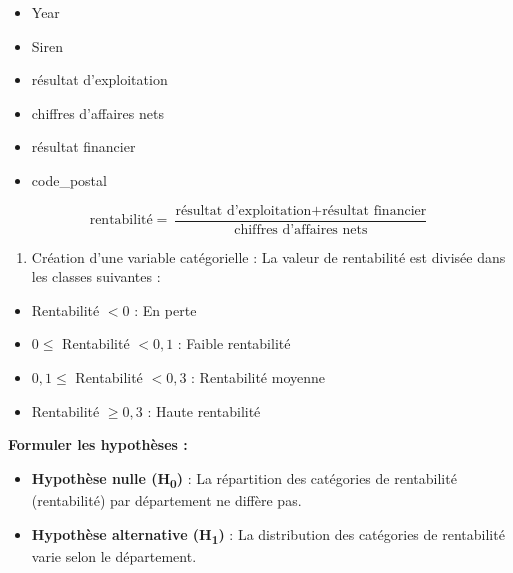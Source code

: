 \documentclass[mstat,12pt]{unswthesis}
\begin{document}
\begin{itemize}[label=$\circ$]
    \item \textnormal{Year}
    \item \textnormal{Siren}
    \item \textnormal{résultat d'exploitation}
    \item \textnormal{chiffres d’affaires nets}
    \item \textnormal{résultat financier}
    \item \textnormal{code\_postal}
\end{itemize}

\[
      \text{rentabilité} = \frac{\text{résultat d'exploitation} + \text{résultat financier}}{\text{chiffres d’affaires nets}}
\]

\begin{enumerate}
\def\labelenumi{\arabic{enumi})}
\setcounter{enumi}{2}
\tightlist
\item
  Création d'une variable catégorielle : La valeur de rentabilité est
  divisée dans les classes suivantes :
\end{enumerate}

\begin{itemize}[label=$\circ$]
    \item \textnormal{Rentabilité $< 0$ : \og En perte\fg}
    \item \textnormal{$0 \leq$ Rentabilité $< 0{,}1$ : \og Faible rentabilité\fg}
    \item \textnormal{$0{,}1 \leq$ Rentabilité $< 0{,}3$ : \og Rentabilité moyenne\fg}
    \item \textnormal{Rentabilité $\geq 0{,}3$ : \og Haute rentabilité\fg}
\end{itemize}

\newpage

\textbf{Formuler les hypothèses :}

\bigskip

\begin{itemize}
\tightlist
\item
  \textbf{Hypothèse nulle (H\textsubscript{0})} : La répartition des
  catégories de rentabilité (rentabilité) par département ne diffère
  pas.
\item
  \textbf{Hypothèse alternative (H\textsubscript{1})} : La distribution
  des catégories de rentabilité varie selon le département.
\end{itemize}

\bigskip
\end{document}
